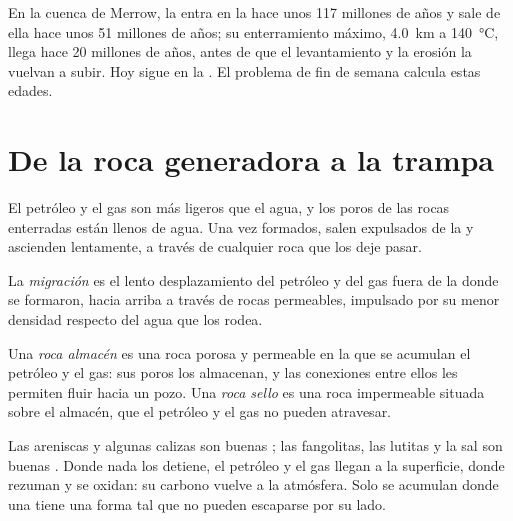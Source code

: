 En la cuenca de Merrow, la  entra en la 
hace unos 117 millones de años y sale de ella hace unos 51 millones de años;
su enterramiento máximo, \qty{4.0}{km} a \qty{140}{\degreeCelsius}, llega hace
20 millones de años, antes de que el levantamiento y la erosión la vuelvan a
subir. Hoy sigue en la . El problema de fin de semana calcula
estas edades.

\section{De la roca generadora a la trampa}

El petróleo y el gas son más ligeros que el agua, y los poros de las rocas
enterradas están llenos de agua. Una vez formados, salen expulsados de la  y ascienden lentamente, a través de cualquier roca que los deje pasar.

\begin{definition}[Migración]\label{def:g11:fossil-fuel-geology:migration}
La \emph{migración} es el lento
desplazamiento del petróleo y del gas fuera de la  donde se
formaron, hacia arriba a través de rocas permeables, impulsado por su menor
densidad respecto del agua que los rodea.
\end{definition}

\begin{definition}\label{def:g11:fossil-fuel-geology:reservoir}
Una \emph{roca almacén} es una roca porosa y permeable
en la que se acumulan el petróleo y el gas: sus poros los almacenan, y las
conexiones entre ellos les permiten fluir hacia un pozo. Una \emph{roca sello} es
una roca impermeable situada sobre el almacén, que el petróleo y el gas no
pueden atravesar.
\end{definition}

Las areniscas y algunas calizas son buenas ; las fangolitas, las
lutitas y la sal son buenas . Donde nada los detiene, el petróleo
y el gas llegan a la superficie, donde rezuman y se oxidan: su carbono vuelve
a la atmósfera. Solo se acumulan donde una  tiene una forma tal que
no pueden escaparse por su lado.

